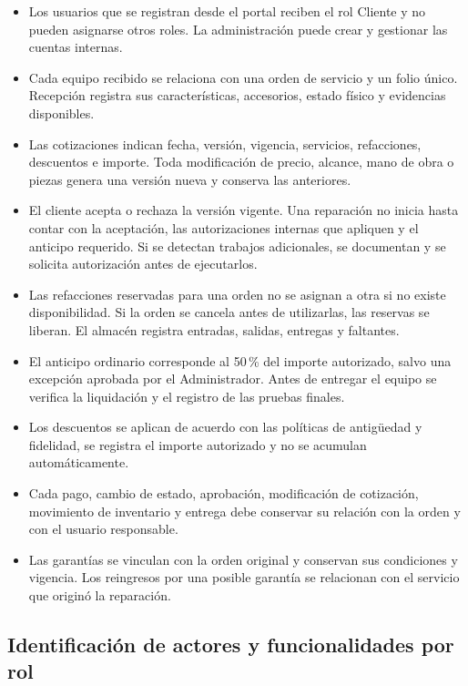 \begin{itemize}
    \item Los usuarios que se registran desde el portal reciben el rol Cliente y no pueden asignarse otros roles. La administración puede crear y gestionar las cuentas internas.
    \item Cada equipo recibido se relaciona con una orden de servicio y un folio único. Recepción registra sus características, accesorios, estado físico y evidencias disponibles.
    \item Las cotizaciones indican fecha, versión, vigencia, servicios, refacciones, descuentos e importe. Toda modificación de precio, alcance, mano de obra o piezas genera una versión nueva y conserva las anteriores.
    \item El cliente acepta o rechaza la versión vigente. Una reparación no inicia hasta contar con la aceptación, las autorizaciones internas que apliquen y el anticipo requerido. Si se detectan trabajos adicionales, se documentan y se solicita autorización antes de ejecutarlos.
    \item Las refacciones reservadas para una orden no se asignan a otra si no existe disponibilidad. Si la orden se cancela antes de utilizarlas, las reservas se liberan. El almacén registra entradas, salidas, entregas y faltantes.
    \item El anticipo ordinario corresponde al 50\,\% del importe autorizado, salvo una excepción aprobada por el Administrador. Antes de entregar el equipo se verifica la liquidación y el registro de las pruebas finales.
    \item Los descuentos se aplican de acuerdo con las políticas de antigüedad y fidelidad, se registra el importe autorizado y no se acumulan automáticamente.
    \item Cada pago, cambio de estado, aprobación, modificación de cotización, movimiento de inventario y entrega debe conservar su relación con la orden y con el usuario responsable.
    \item Las garantías se vinculan con la orden original y conservan sus condiciones y vigencia. Los reingresos por una posible garantía se relacionan con el servicio que originó la reparación.
\end{itemize}

\subsection{Identificación de actores y funcionalidades por rol}

